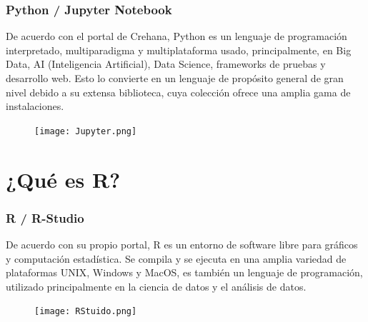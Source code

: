 \begin{frame}[fragile] 
    \frametitle{Python / Jupyter Notebook}

    \begin{center}
De acuerdo con el portal de Crehana, Python es un lenguaje de programación interpretado, multiparadigma y multiplataforma usado, principalmente, en Big Data, AI (Inteligencia Artificial), Data Science, frameworks de pruebas y desarrollo web. Esto lo convierte en un lenguaje de propósito general de gran nivel debido a su extensa biblioteca, cuya colección ofrece una amplia gama de instalaciones.\newline    
    \end{center}

\begin{multicols}{2}
    \begin{center}
    {\color{yellow}{\small Su uso se da principalmente en una herramienta llamada Jupyter Notebook, cuya funcionalidad es interpretar el código en lenguaje Python (iPython) y mostrar sus resultados a pie de línea de una manera interactiva.}}
    \end{center}
    
    \begin{figure}[H]
            \texttt{[image: Jupyter.png]}
    \end{figure}
\end{multicols}
\end{frame}

\section{¿Qué es R?}

\begin{frame}[fragile] 
    \frametitle{R / R-Studio}

    \begin{center}
De acuerdo con su propio portal, R es un entorno de software libre para gráficos y computación estadística. Se compila y se ejecuta en una amplia variedad de plataformas UNIX, Windows y MacOS, es también un lenguaje de programación, utilizado principalmente en la ciencia de datos y el análisis de datos.\newline    
    \end{center}

\begin{multicols}{2}
    \begin{center}
    {\color{aqua}{\small Tal como en Python, R tiene un intérprete (R-Studio) que permite programar en este lenguaje y mostrar sus resultados en una interfaz de manera interactiva. Aunque, R también está siendo usado en otros sofware para edición de texto, como Visual Studio Code.}}
    \end{center}
    
    \begin{figure}[H]
            \texttt{[image: RStuido.png]}
    \end{figure}
\end{multicols}
\end{frame}

